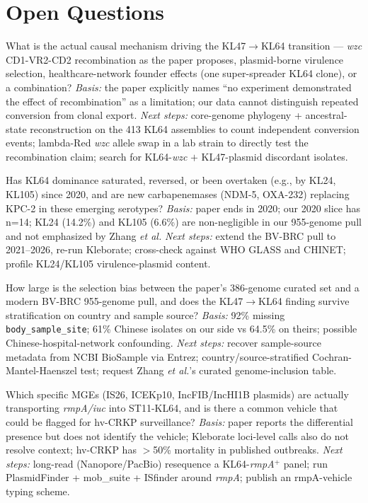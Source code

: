 \documentclass[11pt]{article}
\begin{document}
\section{Open Questions}
\begin{description}[leftmargin=*, style=nextline]
\item[Q1. Mechanism vs.\ clonal export.] What is the actual causal mechanism driving the
KL47$\rightarrow$KL64 transition --- \emph{wzc} CD1-VR2-CD2 recombination as the paper
proposes, plasmid-borne virulence selection, healthcare-network founder effects (one
super-spreader KL64 clone), or a combination?
\emph{Basis:} the paper explicitly names ``no experiment demonstrated the effect of
recombination'' as a limitation; our data cannot distinguish repeated conversion from
clonal export.
\emph{Next steps:} core-genome phylogeny + ancestral-state reconstruction on the 413
KL64 assemblies to count independent conversion events; lambda-Red \emph{wzc} allele
swap in a lab strain to directly test the recombination claim; search for KL64-\emph{wzc}
$+$ KL47-plasmid discordant isolates.

\item[Q2. Post-2020 trajectory.] Has KL64 dominance saturated, reversed, or been
overtaken (e.g., by KL24, KL105) since 2020, and are new carbapenemases (NDM-5,
OXA-232) replacing KPC-2 in these emerging serotypes?
\emph{Basis:} paper ends in 2020; our 2020 slice has n=14; KL24 (14.2\%) and KL105
(6.6\%) are non-negligible in our 955-genome pull and not emphasized by Zhang \emph{et al.}
\emph{Next steps:} extend the BV-BRC pull to 2021--2026, re-run Kleborate; cross-check
against WHO GLASS and CHINET; profile KL24/KL105 virulence-plasmid content.

\item[Q3. Metadata-selection bias.] How large is the selection bias between the paper's
386-genome curated set and a modern BV-BRC 955-genome pull, and does the
KL47$\rightarrow$KL64 finding survive stratification on country and sample source?
\emph{Basis:} 92\% missing \texttt{body\_sample\_site}; 61\% Chinese isolates on our
side vs 64.5\% on theirs; possible Chinese-hospital-network confounding.
\emph{Next steps:} recover sample-source metadata from NCBI BioSample via Entrez;
country/source-stratified Cochran-Mantel-Haenszel test; request Zhang \emph{et al.}'s
curated genome-inclusion table.

\item[Q4. Mobile-element vehicle for virulence.] Which specific MGEs (IS26, ICEKp10,
IncFIB/IncHI1B plasmids) are actually transporting \emph{rmpA/iuc} into ST11-KL64, and
is there a common vehicle that could be flagged for hv-CRKP surveillance?
\emph{Basis:} paper reports the differential presence but does not identify the vehicle;
Kleborate loci-level calls also do not resolve context; hv-CRKP has $>$50\% mortality
in published outbreaks.
\emph{Next steps:} long-read (Nanopore/PacBio) resequence a KL64-\emph{rmpA}$^{+}$
panel; run PlasmidFinder + mob\_suite + ISfinder around \emph{rmpA}; publish an
rmpA-vehicle typing scheme.


\end{description}
\end{document}
